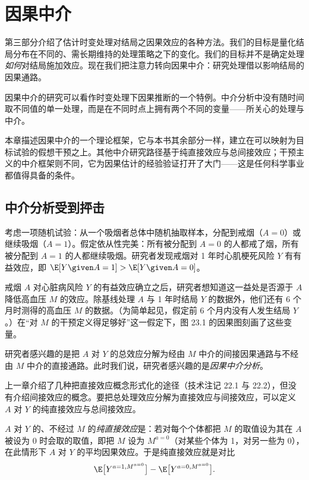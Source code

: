 \chapter{因果中介}

第三部分介绍了估计时变处理对结局之因果效应的各种方法。我们的目标是量化结局分布在不同的、需长期维持的处理策略之下的变化。我们的目标并不是确定处理\emph{如何}对结局施加效应。现在我们把注意力转向因果中介：研究处理借以影响结局的因果通路。

因果中介的研究可以看作时变处理下因果推断的一个特例。中介分析中没有随时间取不同值的单一处理，而是在不同时点上拥有两个不同的变量——所关心的处理与中介。

本章描述因果中介的一个理论框架，它与本书其余部分一样，建立在可以映射为目标试验的假想干预之上。其他中介研究路径基于纯直接效应与总间接效应；干预主义的中介框架则不同，它为因果估计的经验验证打开了大门——这是任何科学事业都值得具备的条件。

\section{中介分析受到抨击}

考虑一项随机试验：从一个吸烟者总体中随机抽取样本，分配到戒烟（$A=0$）或继续吸烟（$A=1$）。假定依从性完美：所有被分配到 $A=0$ 的人都戒了烟，所有被分配到 $A=1$ 的人都继续吸烟。研究者发现戒烟对 1 年时心肌梗死风险 $Y$ 有有益效应，即 $\E[Y\given A=1]>\E[Y\given A=0]$。

戒烟 $A$ 对心脏病风险 $Y$ 的有益效应确立之后，研究者想知道这一益处是否源于 $A$ 降低高血压 $M$ 的效应。除基线处理 $A$ 与 1 年时结局 $Y$ 的数据外，他们还有 6 个月时测得的高血压 $M$ 的数据。（为简单起见，假定前 6 个月内没有人发生结局 $Y$。）在“对 $M$ 的干预定义得足够好”这一假定下，图 23.1 的因果图刻画了这些变量。

研究者感兴趣的是把 $A$ 对 $Y$ 的总效应分解为经由 $M$ 中介的间接因果通路与不经由 $M$ 中介的直接通路。此时我们说，研究者感兴趣的是\emph{因果中介分析}。

上一章介绍了几种把直接效应概念形式化的途径（技术注记 22.1 与 22.2），但没有介绍间接效应的概念。要把总处理效应分解为直接效应与间接效应，可以定义 $A$ 对 $Y$ 的纯直接效应与总间接效应。

$A$ 对 $Y$ 的、不经过 $M$ 的\emph{纯直接效应}是：若对每个个体都把 $M$ 的取值设为其在 $A$ 被设为 0 时会取的取值，即把 $M$ 设为 $M^{a=0}$（对某些个体为 1，对另一些为 0），在此情形下 $A$ 对 $Y$ 的平均因果效应。于是纯直接效应就是对比
\[
\E\big[Y^{a=1,M^{a=0}}\big]-\E\big[Y^{a=0,M^{a=0}}\big].
\]

